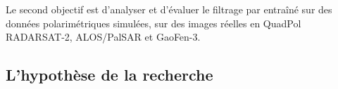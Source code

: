 


Le second objectif est d'analyser et d'évaluer le filtrage par \acrconvnet entraîné sur des données polarimétriques simulées, sur des images réelles en QuadPol RADARSAT-2, ALOS/PalSAR et GaoFen-3.  






\subsection{L'hypothèse de la recherche}

